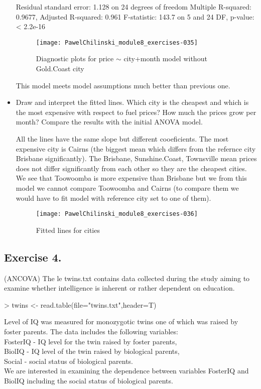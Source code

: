 \documentclass[a4paper]{article}
\begin{document}
\begin{itemize}
\begin{Schunk}
\begin{Soutput}
Residual standard error: 1.128 on 24 degrees of freedom
Multiple R-squared:  0.9677,	Adjusted R-squared:  0.961 
F-statistic: 143.7 on 5 and 24 DF,  p-value: < 2.2e-16
\end{Soutput}
\end{Schunk}

\begin{figure}[H]
\begin{center}
\texttt{[image: PawelChilinski\_module8\_exercises-035]}
\caption{Diagnostic plots for price $\sim$ city+month model without Gold.Coast
city}
\end{center}
\end{figure}
This model meets model assumptions much better than previous one.

\item  Draw and interpret the fitted lines. Which city is the cheapest and which
is the most expensive with respect to fuel prices? How much the prices grow per month? Compare the results with the initial ANOVA model.

All the lines have the same slope but different cooeficients. The most expensive
city is Cairns (the biggest mean which differs from the refernce city Brisbane
significantly). The Brisbane, Sunshine.Coast, Townsville mean prices does not
differ significantly from each other so they are the cheapest cities. We see
that Toowoomba is more expensive than Brisbane but we from this model we cannot
compare Toowoomba and Cairns (to compare them we would have to fit model with
reference city set to one of them).
\begin{figure}[H]
\begin{center}
\texttt{[image: PawelChilinski\_module8\_exercises-036]}
\caption{Fitted lines for cities}
\end{center}
\end{figure}

\end{itemize}

\subsection{Exercise 4.}  (ANCOVA) The le twins.txt  contains data collected
during the study aiming to examine whether intelligence is inherent or rather
dependent on education.
\begin{Schunk}
\begin{Sinput}
> twins <- read.table(file="twins.txt",header=T)
\end{Sinput}
\end{Schunk}
 Level of IQ was measured for monozygotic twins one of which was raised by
foster parents. The data includes the following variables:\\
FosterIQ - IQ level for the twin raised by foster parents,\\
BiolIQ - IQ level of the twin raised by biological parents,\\
Social - social status of biological parents.\\
We are interested in examining the dependence between variables FosterIQ and BiolIQ including the social
status of biological parents.
\end{document}
